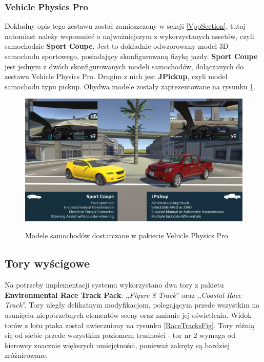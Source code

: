 \subsubsection{Vehicle Physics Pro}
Dokładny opis tego zestawu został zamieszczony w sekcji \ref{VppSection}, tutaj natomiast należy wspomnieć o najważniejszym z wykorzystanych assetów, czyli samochodzie \textbf{Sport Coupe}. Jest to dokładnie odwzorowany model 3D samochodu sportowego, posiadający skonfigurowaną fizykę jazdy. \textbf{Sport Coupe} jest jednym z dwóch skonfigurowanych modeli samochodów, dołączanych do zestawu Vehicle Physics Pro. Drugim z nich jest \textbf{JPickup}, czyli model samochodu typu pickup. Obydwa modele zostały zaprezentowane na rysunku \ref{VppCarModels}. \\

\begin{figure}[h]
\begin{center}
\includegraphics[width=14cm]{resources/figures/vpp-car-models.png}
\caption{Modele samochodów dostarczane w pakiecie Vehicle Physics Pro}
\label{VppCarModels}
\end{center}
\end{figure}

\vspace*{-0.5cm}
\subsection{Tory wyścigowe}
\label{RaceTracksSection}
Na potrzeby implementacji systemu wykorzystano dwa tory z pakietu \textbf{Environmental Race Track Pack}: ,,\textit{Figure 8 Track}'' oraz ,,\textit{Coastal Race Track}''. Tory uległy delikatnym modyfikacjom, polegającym przede wszystkim na usunięciu niepotrzebnych elementów sceny oraz zmianie jej oświetlenia. Widok torów z lotu ptaka został uwieczniony na rysunku \ref{RaceTracksFig}. Tory różnią się od siebie przede wszystkim poziomem trudności - tor nr 2 wymaga od kierowcy znacznie większych umiejętności, ponieważ zakręty są bardziej zróżnicowane.

